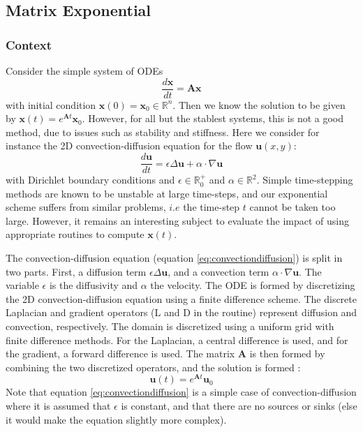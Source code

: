 \documentclass[11pt]{article}
\numberwithin{equation}{section}
\begin{document}
\subsection{Matrix Exponential}\label{sec:matrixexp}
\subsubsection{Context}
Consider the simple system of ODEs
\begin{equation}\label{eq:ode}
    \frac{d\mathbf{x}}{dt} = \mathbf{A}\mathbf{x}
\end{equation}
with initial condition $\mathbf{x}(0) = \mathbf{x}_0\in\mathbb{R}^n$. Then we know the solution to be given by $\mathbf{x}(t)=e^{\mathbf{A}t}\mathbf{x}_0$. However, for all but the stablest systems, this is not a good method, due to issues such as stability and stiffness. Here we consider for instance the 2D convection-diffusion equation for the flow $\mathbf{u}(x,y)$:
\begin{equation}\label{eq:convectiondiffusion}
    \frac{d \mathbf{u}}{d t}=\epsilon\Delta\mathbf{u}+\alpha\cdot\nabla\mathbf{u}
\end{equation}
with Dirichlet boundary conditions and $\epsilon\in\mathbb{R}^{+}_0$ and $\alpha\in\mathbb{R}^2$. Simple time-stepping methods are known to be unstable at large time-steps, and our exponential scheme suffers from similar problems, $\textit{i.e}$ the time-step $t$ cannot be taken too large. However, it remains an interesting subject to evaluate the impact of using appropriate routines to compute $\mathbf{x}(t)$.

The convection-diffusion equation (equation \ref{eq:convectiondiffusion}) is split in two parts. First, a diffusion term $\epsilon\Delta\mathbf{u}$, and a convection term $\alpha\cdot\nabla\mathbf{u}$. The variable $\epsilon$ is the diffusivity and $\alpha$ the velocity. The ODE is formed by discretizing the 2D convection-diffusion equation using a finite difference scheme. The discrete Laplacian and gradient operators (L and D in the routine) represent diffusion and convection, respectively. The domain is discretized using a uniform grid with finite difference methods. For the Laplacian, a central difference is used, and for the gradient, a forward difference is used. The matrix $\mathbf{A}$ is then formed by combining the two discretized operators, and the solution is formed :
\begin{equation}\label{eq:odesolution}
    \mathbf{u}(t) = e^{\mathbf{A}t}\mathbf{u}_0
\end{equation}
Note that equation \ref{eq:convectiondiffusion} is a simple case of convection-diffusion where it is assumed that $\epsilon$ is constant, and that there are no sources or sinks (else it would make the equation slightly more complex). 
\end{document}
